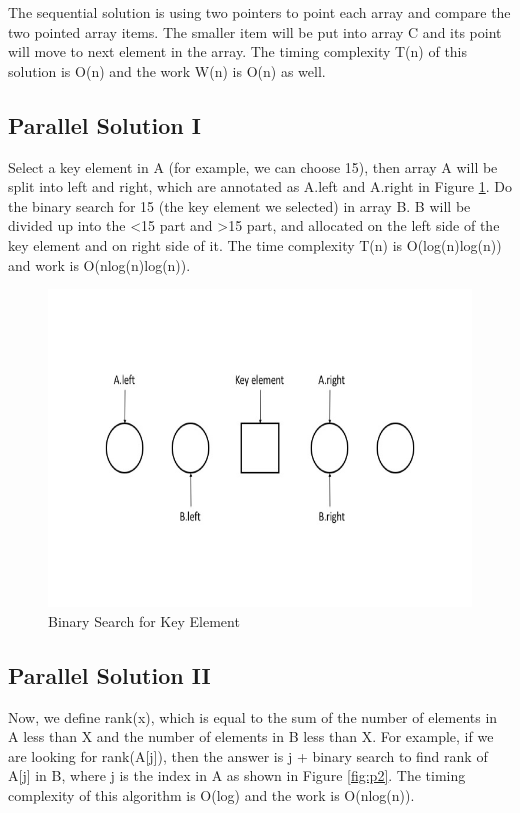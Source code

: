 \documentclass[twoside]{article}
\begin{document}
The sequential solution is using two pointers to point each array and compare the two pointed array items. The smaller item will be put into array C and its point will move to next element in the array. The timing complexity T(n) of this solution is O(n) and the work W(n) is O(n) as well. 

\subsection{Parallel Solution I}
Select a key element in A (for example, we can choose 15), then array A will be split into left and right, which are annotated as A.left and A.right in Figure \ref{fig:p1}. Do the binary search for 15 (the key element we selected) in array B. B will be divided up into the  \textless 15 part and \textgreater 15 part, and allocated on the left side of the key element and on right side of it. The time complexity T(n) is O(log(n)log(n)) and work is O(nlog(n)log(n)). 

\begin{figure}[ht]
  \centering
  \includegraphics[height=0.250\textheight,width=0.750\linewidth]{./p1.jpg} 
  \caption{Binary Search for Key Element}
  \label{fig:p1}
\end{figure}

\subsection{Parallel Solution II}
Now, we define rank(x), which is equal to the sum of the number of elements in A less than X and the number of elements in B less than X. For example, if we are looking for rank(A[j]), then the answer is j + binary search to find rank of A[j] in B, where j is the index in A as shown in Figure \ref{fig:p2}. The timing complexity of this algorithm is O(log) and the work is O(nlog(n)).
\end{document}
